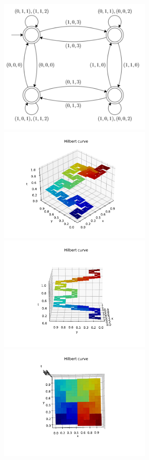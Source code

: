 \documentclass[landscape,usenames,dvipsnames]{sciposter}
\begin{document}
\begin{multicols}{3}
\begin{center}
    \includegraphics[width=7.5cm]{FA20/images/fractals/hilbert-automata.png}
    \includegraphics[width=7.5cm]{FA20/images/fractals/hilbert-1.pdf}
    \includegraphics[width=7.5cm]{FA20/images/fractals/hilbert-2.pdf}
    \includegraphics[width=7.5cm]{FA20/images/fractals/hilbert-3.pdf} \\

\end{center}
\end{multicols}
\end{document}
